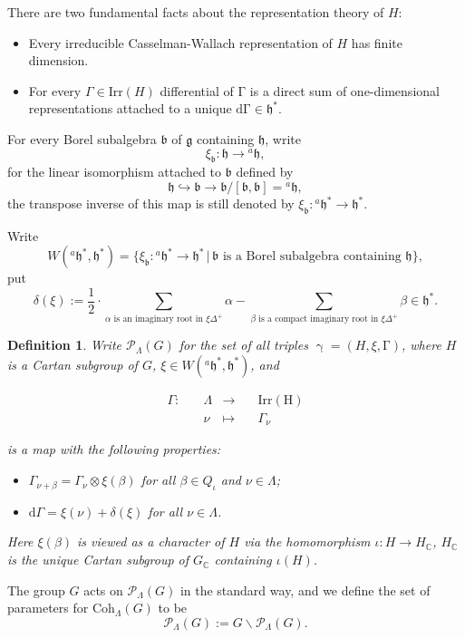 \documentclass[12pt, a4paper]{amsart}
\numberwithin{equation}{section}
\newtheorem{defn}[thm]{Definition}
\newcommand{\BC}{{\mathbb {C}}}
\newcommand{\CP}{{\mathcal {P}}}
\newcommand{\fb}{\mathfrak{b}}
\newcommand{\fg}{\mathfrak{g}}
\newcommand{\fh}{\mathfrak{h}}
\newcommand{\set}[2]{\{#1\,|\,#2\}}
\newcommand{\defmap}[5]{
           \begin{equation*}
              \begin{aligned}
                   #1:\quad  & #2 &\longrightarrow &\quad #3 \\
                      \quad  & #4    &\longmapsto  &\quad #5
              \end{aligned}
           \end{equation*}
          }
\begin{document}
There are two fundamental facts about the representation theory of $H$:
\begin{itemize}
    \item Every irreducible Casselman-Wallach representation of $H$ has finite  dimension.
    \item For every $\Gamma \in \mathrm{Irr}(H)$ differential of $\mathrm{\Gamma}$ is a direct sum of one-dimensional representations attached to a unique $\mathrm{d\Gamma} \in \fh^*$.
\end{itemize}

For every Borel subalgebra $\fb$ of $\fg$ containing $\fh$, write
$$\xi_{\fb}: \fh \to {^{a}\fh},$$
for the linear isomorphism attached to $\fb$ defined by
$$\fh \hookrightarrow \fb \to \fb / [\fb , \fb] =  {^{a}\fh},$$
the transpose inverse of this map is still denoted by $\xi_{\fb}: {^{a}\fh^*} \to \fh^*$.

Write
\begin{equation}
    W(^{a}\fh^*,\fh^*) = \set{\xi_{\fb}: {^{a}\fh}^* \to \fh^*}{\textrm{$\fb$ is a Borel subalgebra containing $\fh$}},
\end{equation}
put
\begin{equation}
    \delta(\xi) := \frac{1}{2} \cdot \sum_{\textrm{$\alpha$ is an imaginary root in $\xi \Delta^{+}$}}\alpha - \sum_{\textrm{$\beta$ is a compact imaginary root in $\xi \Delta^{+}$}}\beta \in \fh^*.
\end{equation}

\begin{defn}\label{regular character}
    Write $\mathscr{P}_{\Lambda}(G)$ for the set of all triples $\upgamma = (H,\xi,\mathrm{\Gamma})$, where $H$ is a Cartan subgroup of $G$, $\xi \in W(^{a}\fh^*,\fh^*)$, and
    \defmap{\Gamma}{\Lambda}{\mathrm{Irr(H)}}{\nu}{\Gamma_{\nu}}
    is a map with the following properties:
    \begin{itemize}
        \item $\Gamma_{\nu+\beta} = \Gamma_{\nu} \otimes \xi(\beta)$ for all $\beta \in Q_{\iota}$ and $\nu \in \Lambda$;
        \item $\mathrm{d}\Gamma = \xi(\nu) + \delta(\xi)$ for all $\nu \in \Lambda$.
    \end{itemize}
    Here $\xi(\beta)$ is viewed as a character of $H$ via the homomorphism $\iota: H \to H_{\BC}$, $H_{\BC}$ is the unique Cartan subgroup of $G_{\BC}$ containing $\iota(H)$.
\end{defn}

The group $G$ acts on $\mathscr{P}_{\Lambda}(G)$ in the standard way, and we define the set of parameters for $\mathrm{Coh}_{\Lambda}(G)$ to be
\begin{equation}
    \CP_{\Lambda}(G) := G \backslash \mathscr{P}_{\Lambda}(G) .
\end{equation}
\end{document}
